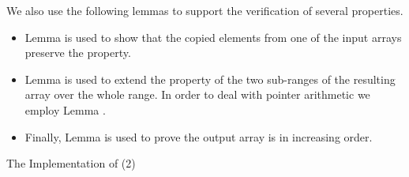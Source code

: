 

We also use the following lemmas to support the verification of several properties.

\begin{itemize}
\item
Lemma  is used to show that the
copied elements from one of the input arrays preserve the \WeaklyIncreasing property.

\item
Lemma  is used
to
extend the \WeaklyIncreasing 
property of the two sub-ranges of the resulting array over the whole range.
In order to deal with pointer arithmetic we employ Lemma \WeaklyIncreasingShift.

\item 
Finally, Lemma 
is used to prove the output array is in increasing order.
\end{itemize}

\begin{listing}[hbt]
\begin{minipage}{\textwidth}

\end{minipage}
\caption{\label{lst:merge-impl2}The Implementation of \merge (2)}
\end{listing}



\clearpage


